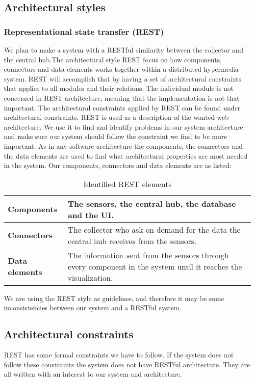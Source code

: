 \documentclass[../document.tex]{subfiles}
\begin{document}
\subsection{Architectural styles}
\subsubsection{Representational state transfer (REST)}
We plan to make a system with a RESTful similarity between the collector and the central hub.The architectural style REST focus on how components, connectors and data elements works together within a distributed hypermedia system. REST will accomplish that by having a set of architectural constraints that applies to all modules and their relations. The individual module is not concerned in REST architecture, meaning that the implementation is not that important. The architectural constraints applied by REST can be found under architectural constraints. REST is used as a description of the wanted web architecture. We use it to find and identify problems in our system architecture and make sure our system should follow the constraint we find to be more important. As in any software architecture the components, the connectors and the data elements are used to find what architectural properties are most needed in the system. Our components, connectors and data elements are as listed:

\begin{table}[H]
\caption{Identified REST elements}
\begin{tabularx}{\textwidth}{|X|X|}
\hline
\textbf{Components}
&
The sensors, the central hub, the database and the UI.
\\ \hline
\textbf{Connectors}
&
The collector who ask on-demand for the data the central hub receives from the sensors.
\\ \hline
\textbf{Data elements}
&
The information sent from the sensors through every component in the system until it reaches  the visualization. 
\\ \hline
\end{tabularx}
\end{table}

We are using the REST style as guidelines, and therefore it may be some inconsistencies between our system and a RESTful system. 

\subsection{Architectural constraints}
REST has some formal constraints we have to follow. If the system does not follow these constraints the system does not have RESTful architecture. They are all written with an interest to our system and architecture.
\end{document}
